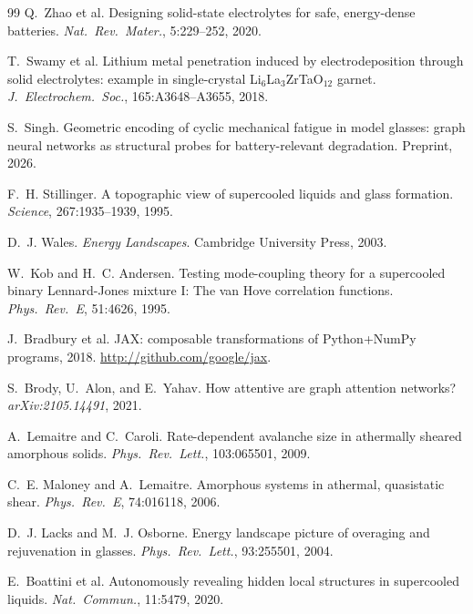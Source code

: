 \documentclass[12pt,a4paper]{article}
\begin{document}
\begin{thebibliography}{99}
Q.~Zhao et al.
\newblock Designing solid-state electrolytes for safe, energy-dense batteries.
\newblock \emph{Nat.~Rev.~Mater.}, 5:229--252, 2020.

T.~Swamy et al.
\newblock Lithium metal penetration induced by electrodeposition through solid electrolytes: example in single-crystal Li$_6$La$_3$ZrTaO$_{12}$ garnet.
\newblock \emph{J.~Electrochem.~Soc.}, 165:A3648--A3655, 2018.

S.~Singh.
\newblock Geometric encoding of cyclic mechanical fatigue in model glasses: graph neural networks as structural probes for battery-relevant degradation.
\newblock Preprint, 2026.

F.~H. Stillinger.
\newblock A topographic view of supercooled liquids and glass formation.
\newblock \emph{Science}, 267:1935--1939, 1995.

D.~J. Wales.
\newblock \emph{Energy Landscapes}.
\newblock Cambridge University Press, 2003.

W.~Kob and H.~C. Andersen.
\newblock Testing mode-coupling theory for a supercooled binary Lennard-Jones mixture I: The van Hove correlation functions.
\newblock \emph{Phys.~Rev.~E}, 51:4626, 1995.

J.~Bradbury et al.
\newblock JAX: composable transformations of Python+NumPy programs, 2018.
\newblock \url{http://github.com/google/jax}.

S.~Brody, U.~Alon, and E.~Yahav.
\newblock How attentive are graph attention networks?
\newblock \emph{arXiv:2105.14491}, 2021.

A.~Lemaitre and C.~Caroli.
\newblock Rate-dependent avalanche size in athermally sheared amorphous solids.
\newblock \emph{Phys.~Rev.~Lett.}, 103:065501, 2009.

C.~E. Maloney and A.~Lemaitre.
\newblock Amorphous systems in athermal, quasistatic shear.
\newblock \emph{Phys.~Rev.~E}, 74:016118, 2006.

D.~J. Lacks and M.~J. Osborne.
\newblock Energy landscape picture of overaging and rejuvenation in glasses.
\newblock \emph{Phys.~Rev.~Lett.}, 93:255501, 2004.

E.~Boattini et al.
\newblock Autonomously revealing hidden local structures in supercooled liquids.
\newblock \emph{Nat.~Commun.}, 11:5479, 2020.


\end{thebibliography}
\end{document}
